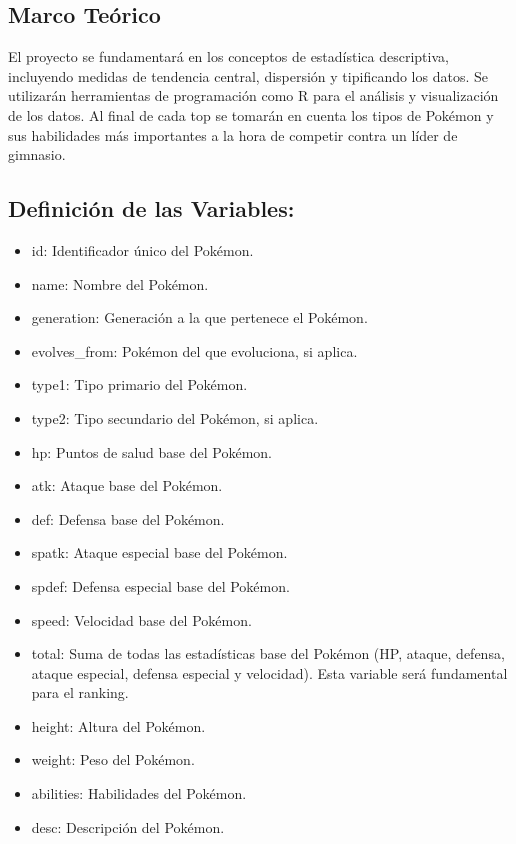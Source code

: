 \documentclass[
]{article}
\providecommand{\tightlist}{%
  \setlength{\itemsep}{0pt}\setlength{\parskip}{0pt}}
\begin{document}
\subsection{Marco Teórico}\label{marco-teuxf3rico}

El proyecto se fundamentará en los conceptos de estadística descriptiva,
incluyendo medidas de tendencia central, dispersión y tipificando los
datos. Se utilizarán herramientas de programación como R para el
análisis y visualización de los datos. Al final de cada top se tomarán
en cuenta los tipos de Pokémon y sus habilidades más importantes a la
hora de competir contra un líder de gimnasio.

\subsection{Definición de las
Variables:}\label{definiciuxf3n-de-las-variables}

\begin{itemize}
\tightlist
\item
  id: Identificador único del Pokémon.
\item
  name: Nombre del Pokémon.
\item
  generation: Generación a la que pertenece el Pokémon.
\item
  evolves\_from: Pokémon del que evoluciona, si aplica.
\item
  type1: Tipo primario del Pokémon.
\item
  type2: Tipo secundario del Pokémon, si aplica.
\item
  hp: Puntos de salud base del Pokémon.
\item
  atk: Ataque base del Pokémon.
\item
  def: Defensa base del Pokémon.
\item
  spatk: Ataque especial base del Pokémon.
\item
  spdef: Defensa especial base del Pokémon.
\item
  speed: Velocidad base del Pokémon.
\item
  total: Suma de todas las estadísticas base del Pokémon (HP, ataque,
  defensa, ataque especial, defensa especial y velocidad). Esta variable
  será fundamental para el ranking.
\item
  height: Altura del Pokémon.
\item
  weight: Peso del Pokémon.
\item
  abilities: Habilidades del Pokémon.
\item
  desc: Descripción del Pokémon.
\end{itemize}
\end{document}
